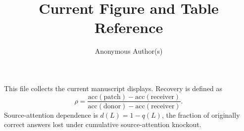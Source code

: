 \documentclass[sigconf,anonymous,review]{acmart}
\begin{document}
\title{Current Figure and Table Reference}
\author{Anonymous Author(s)}
\maketitle
This file collects the current manuscript displays. Recovery is defined as
\begin{equation}
\rho=\frac{\mathrm{acc}(\mathrm{patch})-\mathrm{acc}(\mathrm{receiver})}
{\mathrm{acc}(\mathrm{donor})-\mathrm{acc}(\mathrm{receiver})}.
\label{eq:rho}
\end{equation}
Source-attention dependence is $d(L)=1-q(L)$, the fraction of originally
correct answers lost under cumulative source-attention knockout.

\clearpage

\clearpage

\clearpage

\clearpage

\clearpage

\clearpage

\clearpage

\clearpage

\clearpage

\clearpage
\end{document}
